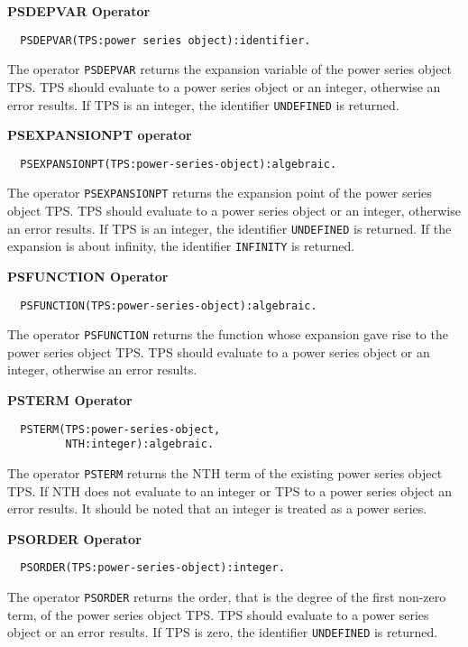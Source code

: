 \textbf{PSDEPVAR Operator}
\hypertarget{operator:PSDEPVAR}{}
\begin{verbatim}
  PSDEPVAR(TPS:power series object):identifier.
\end{verbatim}
The operator \texttt{PSDEPVAR} returns the expansion variable of the
power series object TPS. TPS should evaluate to a power
series object or an integer, otherwise an error results. If TPS
is an integer, the identifier \texttt{UNDEFINED} is returned.

\textbf{PSEXPANSIONPT operator}
\hypertarget{operator:PSEXPANSIONPT}{}
\begin{verbatim}
  PSEXPANSIONPT(TPS:power-series-object):algebraic.
\end{verbatim}
The operator \texttt{PSEXPANSIONPT} returns the expansion point of the
power series object TPS. TPS should evaluate to a power
series object or an integer, otherwise an error results. If TPS
is an integer, the identifier \texttt{UNDEFINED} is returned. If the
expansion is about infinity, the identifier \texttt{INFINITY} is
returned.

\textbf{PSFUNCTION Operator}
\hypertarget{operator:PSFUNCTION}{}
\begin{verbatim}
  PSFUNCTION(TPS:power-series-object):algebraic.
\end{verbatim}
The operator \texttt{PSFUNCTION} returns the function whose expansion
gave rise to the power series object TPS. TPS should
evaluate to a power series object or an integer, otherwise an error
results.

\textbf{PSTERM Operator}
\hypertarget{operator:PSTERM}{}
\begin{verbatim}
  PSTERM(TPS:power-series-object, 
         NTH:integer):algebraic.
\end{verbatim}
The operator \texttt{PSTERM} returns the NTH term of the existing
power series object TPS. If NTH does not evaluate to
an integer or TPS to a power series object an error results.  It
should be noted that an integer is treated as a power series.

\textbf{PSORDER Operator}
\hypertarget{operator:PSORDER}{}
\begin{verbatim}
  PSORDER(TPS:power-series-object):integer.
\end{verbatim}
The operator \texttt{PSORDER} returns the order, that is the degree of
the first non-zero term, of the power series object TPS.
TPS should evaluate to a power series object or an error results. If
TPS is zero, the identifier \texttt{UNDEFINED} is returned.

